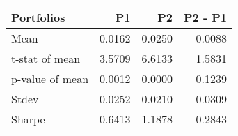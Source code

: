 \begin{tabular}{lrrr}
\toprule
Portfolios & P1 & P2 & P2 - P1 \\
\midrule
Mean & 0.0162 & 0.0250 & 0.0088 \\
t-stat of mean & 3.5709 & 6.6133 & 1.5831 \\
p-value of mean & 0.0012 & 0.0000 & 0.1239 \\
Stdev & 0.0252 & 0.0210 & 0.0309 \\
Sharpe & 0.6413 & 1.1878 & 0.2843 \\
\bottomrule
\end{tabular}
